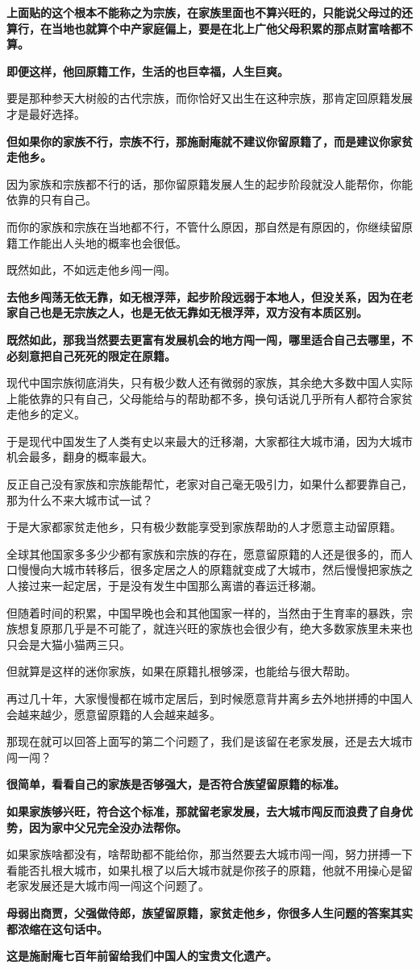\documentclass[UTF8, 11pt, oneside]{ctexart}
\newcommand{\zd}[1]{\textbf{\textcolor[RGB]{123,12,0}{#1}}} %
\begin{document}
\zd{上面贴的这个根本不能称之为宗族，在家族里面也不算兴旺的，只能说父母过的还算行，在当地也就算个中产家庭偏上，要是在北上广他父母积累的那点财富啥都不算。}

\zd{即便这样，他回原籍工作，生活的也巨幸福，人生巨爽。}

要是那种参天大树般的古代宗族，而你恰好又出生在这种宗族，那肯定回原籍发展才是最好选择。

\zd{但如果你的家族不行，宗族不行，那施耐庵就不建议你留原籍了，而是建议你家贫走他乡。}

因为家族和宗族都不行的话，那你留原籍发展人生的起步阶段就没人能帮你，你能依靠的只有自己。

而你的家族和宗族在当地都不行，不管什么原因，那自然是有原因的，你继续留原籍工作能出人头地的概率也会很低。

既然如此，不如远走他乡闯一闯。

\zd{去他乡闯荡无依无靠，如无根浮萍，起步阶段远弱于本地人，但没关系，因为在老家自己也是无宗族之人，也是无依无靠如无根浮萍，双方没有本质区别。}

\zd{既然如此，那我当然要去更富有发展机会的地方闯一闯，哪里适合自己去哪里，不必刻意把自己死死的限定在原籍。}

现代中国宗族彻底消失，只有极少数人还有微弱的家族，其余绝大多数中国人实际上能依靠的只有自己，父母能给与的帮助都不多，换句话说几乎所有人都符合家贫走他乡的定义。

于是现代中国发生了人类有史以来最大的迁移潮，大家都往大城市涌，因为大城市机会最多，翻身的概率最大。

反正自己没有家族和宗族能帮忙，老家对自己毫无吸引力，如果什么都要靠自己，那为什么不来大城市试一试？

于是大家都家贫走他乡，只有极少数能享受到家族帮助的人才愿意主动留原籍。

全球其他国家多多少少都有家族和宗族的存在，愿意留原籍的人还是很多的，而人口慢慢向大城市转移后，很多定居之人的原籍就变成了大城市，然后慢慢把家族之人接过来一起定居，于是没有发生中国那么离谱的春运迁移潮。

但随着时间的积累，中国早晚也会和其他国家一样的，当然由于生育率的暴跌，宗族想复原那几乎是不可能了，就连兴旺的家族也会很少有，绝大多数家族里未来也只会是大猫小猫两三只。

但就算是这样的迷你家族，如果在原籍扎根够深，也能给与很大帮助。

再过几十年，大家慢慢都在城市定居后，到时候愿意背井离乡去外地拼搏的中国人会越来越少，愿意留原籍的人会越来越多。

那现在就可以回答上面写的第二个问题了，我们是该留在老家发展，还是去大城市闯一闯？

\zd{很简单，看看自己的家族是否够强大，是否符合族望留原籍的标准。}

\zd{如果家族够兴旺，符合这个标准，那就留老家发展，去大城市闯反而浪费了自身优势，因为家中父兄完全没办法帮你。}

如果家族啥都没有，啥帮助都不能给你，那当然要去大城市闯一闯，努力拼搏一下看能否扎根大城市，如果扎根了以后大城市就是你孩子的原籍，他就不用操心是留老家发展还是大城市闯一闯这个问题了。

\zd{母弱出商贾，父强做侍郎，族望留原籍，家贫走他乡，你很多人生问题的答案其实都浓缩在这句话中。}

\zd{这是施耐庵七百年前留给我们中国人的宝贵文化遗产。}
\end{document}
